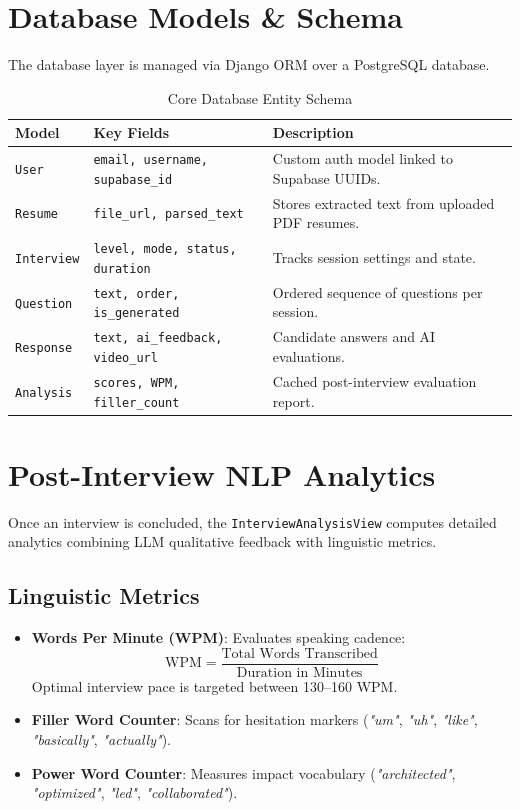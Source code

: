 \documentclass[twocolumn, 10pt, a4paper]{article}
\begin{document}
\section{Database Models \& Schema}
The database layer is managed via Django ORM over a PostgreSQL database.

\begin{table}[h]
\centering
\small
\color{monodark}
\caption{\color{monodark} Core Database Entity Schema}
\label{tab:schema}
\begin{tabularx}{\linewidth}{l l X}
\toprule
\textbf{Model} & \textbf{Key Fields} & \textbf{Description} \\
\midrule
\texttt{User} & \texttt{email, username, supabase\_id} & Custom auth model linked to Supabase UUIDs. \\
\texttt{Resume} & \texttt{file\_url, parsed\_text} & Stores extracted text from uploaded PDF resumes. \\
\texttt{Interview} & \texttt{level, mode, status, duration} & Tracks session settings and state. \\
\texttt{Question} & \texttt{text, order, is\_generated} & Ordered sequence of questions per session. \\
\texttt{Response} & \texttt{text, ai\_feedback, video\_url} & Candidate answers and AI evaluations. \\
\texttt{Analysis} & \texttt{scores, WPM, filler\_count} & Cached post-interview evaluation report. \\
\bottomrule
\end{tabularx}
\end{table}

\section{Post-Interview NLP Analytics}
Once an interview is concluded, the \texttt{InterviewAnalysisView} computes detailed analytics combining LLM qualitative feedback with linguistic metrics.

\subsection{Linguistic Metrics}
\begin{itemize}
    \item \textbf{Words Per Minute (WPM)}: Evaluates speaking cadence:
    \begin{equation}
        \text{WPM} = \frac{\text{Total Words Transcribed}}{\text{Duration in Minutes}}
    \end{equation}
    Optimal interview pace is targeted between 130--160 WPM.
    \item \textbf{Filler Word Counter}: Scans for hesitation markers (\textit{"um"}, \textit{"uh"}, \textit{"like"}, \textit{"basically"}, \textit{"actually"}).
    \item \textbf{Power Word Counter}: Measures impact vocabulary (\textit{"architected"}, \textit{"optimized"}, \textit{"led"}, \textit{"collaborated"}).
\end{itemize}
\end{document}
